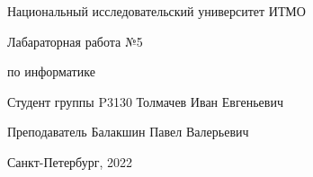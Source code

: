 \begin{titlepage}
\thispagestyle{empty}

\centerline{Национальный исследовательский университет ИТМО}

\vfill

\centerline{\huge{Лабараторная работа №5}}
\centerline{\large{по информатике}}

\vfill

Студент группы P3130 \hfill Толмачев Иван Евгеньевич

Преподаватель \hfill Балакшин Павел Валерьевич

\vfill

\centerline{Санкт-Петербург, 2022}
\clearpage
\end{titlepage}
